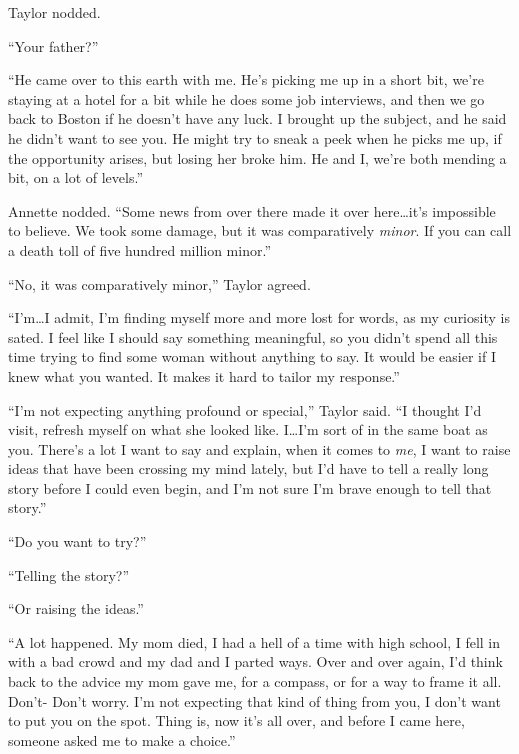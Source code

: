 Taylor nodded.



``Your father?''



``He came over to this earth with me.  He's picking me up in a short bit, we're staying at a hotel for a bit while he does some job interviews, and then we go back to Boston if he doesn't have any luck.  I brought up the subject, and he said he didn't want to see you.  He might try to sneak a peek when he picks me up, if the opportunity arises, but losing her broke him.  He and I, we're both mending a bit, on a lot of levels.''



Annette nodded.  ``Some news from over there made it over here\ldots it's impossible to believe.  We took some damage, but it was comparatively \emph{minor}.  If you can call a death toll of five hundred million minor.''



``No, it was comparatively minor,'' Taylor agreed.



``I'm\ldots I admit, I'm finding myself more and more lost for words, as my curiosity is sated.  I feel like I should say something meaningful, so you didn't spend all this time trying to find some woman without anything to say.  It would be easier if I knew what you wanted.  It makes it hard to tailor my response.''



``I'm not expecting anything profound or special,'' Taylor said.  ``I thought I'd visit, refresh myself on what she looked like.  I\ldots I'm sort of in the same boat as you.  There's a lot I want to say and explain, when it comes to \emph{me}, I want to raise ideas that have been crossing my mind lately, but I'd have to tell a really long story before I could even begin, and I'm not sure I'm brave enough to tell that story.''



``Do you want to try?''



``Telling the story?''



``Or raising the ideas.''



``A lot happened.  My mom died, I had a hell of a time with high school, I fell in with a bad crowd and my dad and I parted ways.  Over and over again, I'd think back to the advice my mom gave me, for a compass, or for a way to frame it all.  Don't- Don't worry.  I'm not expecting that kind of thing from you, I don't want to put you on the spot.  Thing is, now it's all over, and before I came here, someone asked me to make a choice.''



